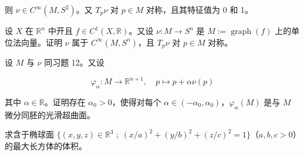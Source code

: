 \begin{exercises}
则 $ \nu \in C^{\infty}(M,S^{2}) $。又 $ T_{p}\nu $ 对 $ p \in M $ 对称，且其特征值为 0 和 1。

\item

设 $ X $ 在 $ \mathbb{R}^{n} $ 中开且 $ f \in C^{1}(X,\mathbb{R}) $。又设 $ \nu : M \to S^{n} $ 是 $ M := \operatorname{graph}(f) $ 上的单位法向量。证明 $ \nu $ 属于 $ C^{\infty}(M,S^{n}) $，且 $ T_{p}\nu $ 对 $ p \in M $ 对称。

\item

设 $ M $ 与 $ \nu $ 同习题 12。又设

\[
\varphi_{\alpha} : M \to \mathbb{R}^{n+1} , \quad p \mapsto p + \alpha\nu(p)
\]

其中 $ \alpha \in \mathbb{R} $。证明存在 $ \alpha_{0} > 0 $，使得对每个 $ \alpha \in (-\alpha_{0},\alpha_{0}) $，$ \varphi_{\alpha}(M) $ 是与 $ M $ 微分同胚的光滑超曲面。

\item

求含于椭球面 $ \{ (x,y,z) \in \mathbb{R}^{3} \; ; \; (x/a)^{2} + (y/b)^{2} + (z/c)^{2} = 1 \} $（$ a,b,c > 0 $）的最大长方体的体积。

\end{exercises}
